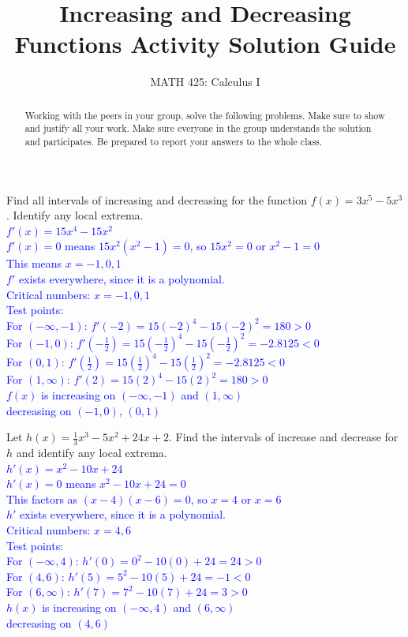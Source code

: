 \documentclass{ximera}
\title{Increasing and Decreasing Functions Activity Solution Guide}
\author{MATH 425: Calculus I}
\begin{document}
\begin{abstract}
   Working with the peers in your group, solve the following problems. Make sure to show and justify all your work. Make sure everyone in the group understands the solution and participates. Be prepared to report your answers to the whole class. 
\end{abstract}
\maketitle


\begin{exercise}
    Find all intervals of increasing and decreasing for the function $f(x)=3x^5-5x^3$.  Identify any local extrema.\\
    \textcolor{blue}{$f'(x)=15x^4-15x^2$\\
    $f'(x)=0$ means $15x^2(x^2-1)=0$, so $15x^2=0$ or $x^2-1=0$\\
    This means $x=-1, 0, 1$\\
    $f'$ exists everywhere, since it is a polynomial.\\
    Critical numbers: $x=-1,0,1$\\
    Test points:\\
    For $(-\infty,-1)$: $f'(-2)=15(-2)^4-15(-2)^2=180>0$\\
    For $(-1,0)$: $f'(-\frac12)=15(-\frac12)^4-15(-\frac12)^2=-2.8125<0$\\
    For $(0,1)$: $f'(\frac12)=15(\frac12)^4-15(\frac12)^2=-2.8125<0$\\
    For $(1,\infty)$: $f'(2)=15(2)^4-15(2)^2=180>0$\\
    $f(x)$ is increasing on $(-\infty,-1)$ and $(1,\infty)$\\
    decreasing on $(-1,0)$, $(0,1)$}
\end{exercise}

\begin{exercise}
    Let $h(x)=\frac{1}{3}x^3-5x^2+24x+2$. Find the intervals of increase and decrease for $h$ and identify any local extrema.\\
    \textcolor{blue}{$h'(x)=x^2-10x+24$\\
    $h'(x)=0$ means $x^2-10x+24=0$\\
    This factors as $(x-4)(x-6)=0$, so $x=4$ or $x=6$\\
    $h'$ exists everywhere, since it is a polynomial.\\
    Critical numbers: $x=4,6$\\
    Test points:\\
    For $(-\infty,4)$: $h'(0)=0^2-10(0)+24=24>0$\\
    For $(4,6)$: $h'(5)=5^2-10(5)+24=-1<0$\\
    For $(6,\infty)$: $h'(7)=7^2-10(7)+24=3>0$\\
    $h(x)$ is increasing on $(-\infty,4)$ and $(6,\infty)$\\
    decreasing on $(4,6)$}
\end{exercise}
\end{document}
